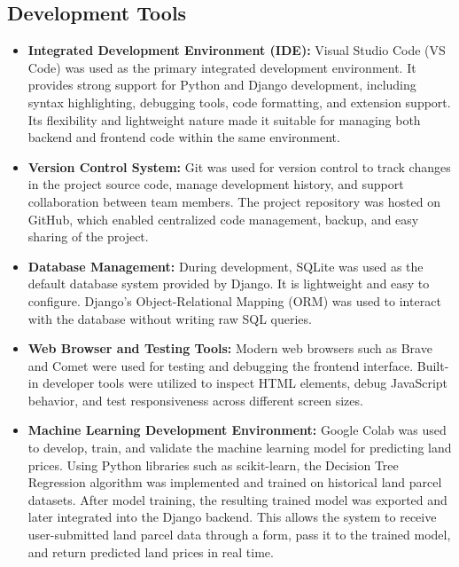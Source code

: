 \documentclass[12pt,oneside]{report}
\begin{document}
\subsection{Development Tools}
\begin{itemize}[leftmargin=*, itemsep=3pt]
    \item \textbf{Integrated Development Environment (IDE):} Visual Studio Code (VS Code) was used as the primary integrated development environment. It provides strong support for Python and Django development, including syntax highlighting, debugging tools, code formatting, and extension support. Its flexibility and lightweight nature made it suitable for managing both backend and frontend code within the same environment.

    \item \textbf{Version Control System:} Git was used for version control to track changes in the project source code, manage development history, and support collaboration between team members. The project repository was hosted on GitHub, which enabled centralized code management, backup, and easy sharing of the project.

    \item \textbf{Database Management:} During development, SQLite was used as the default database system provided by Django. It is lightweight and easy to configure. Django’s Object-Relational Mapping (ORM) was used to interact with the database without writing raw SQL queries.

    \item \textbf{Web Browser and Testing Tools:} Modern web browsers such as Brave and Comet were used for testing and debugging the frontend interface. Built-in developer tools were utilized to inspect HTML elements, debug JavaScript behavior, and test responsiveness across different screen sizes.

    \item \textbf{Machine Learning Development Environment:} Google Colab was used to develop, train, and validate the machine learning model for predicting land prices. Using Python libraries such as scikit-learn, the Decision Tree Regression algorithm was implemented and trained on historical land parcel datasets. After model training, the resulting trained model was exported and later integrated into the Django backend. This allows the system to receive user-submitted land parcel data through a form, pass it to the trained model, and return predicted land prices in real time.
\end{itemize}
\end{document}
